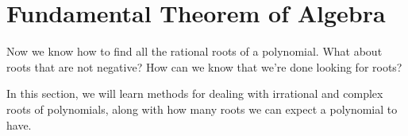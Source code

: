 \section{Fundamental Theorem of Algebra} 
Now we know how to find all the rational roots of a polynomial. What about roots that are not negative? How can we know that we're done looking for roots?

In this section, we will learn methods for dealing with irrational and complex roots of polynomials, along with how many roots we can expect a polynomial to have.



 
% 


